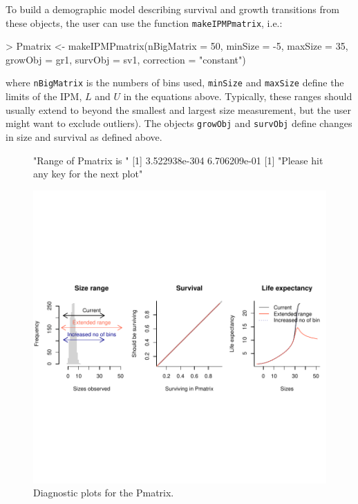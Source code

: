 \documentclass{article}
\begin{document}
To build a demographic model describing survival and growth transitions from these objects, the user can use the function {\tt makeIPMPmatrix}, i.e.: 
\begin{Schunk}
\begin{Sinput}
> Pmatrix <- makeIPMPmatrix(nBigMatrix = 50, 
                              minSize = -5, maxSize = 35, 
                              growObj = gr1, survObj = sv1, 
                              correction = "constant")
\end{Sinput}
\end{Schunk}
where {\tt nBigMatrix} is the numbers of bins used, {\tt minSize} and
{\tt maxSize} define the limits of the IPM, $L$ and $U$ in the
equations above. Typically, these ranges should usually extend to beyond the
smallest and largest size measurement, but the user might want to exclude
outliers). The objects {\tt growObj} and {\tt survObj} define changes in size
and survival as defined above. 

\begin{figure}
\begin{center}
\begin{Schunk}
\begin{Soutput}
[1] "Range of Pmatrix is "
[1] 3.522938e-304  6.706209e-01
[1] "Please hit any key for the next plot"
\end{Soutput}
\end{Schunk}
\includegraphics{IPMpack_Vignette-triDiag}
\end{center}
\caption{Diagnostic plots for the Pmatrix.}
\label{fig:triDiag}
\end{figure}
\end{document}

